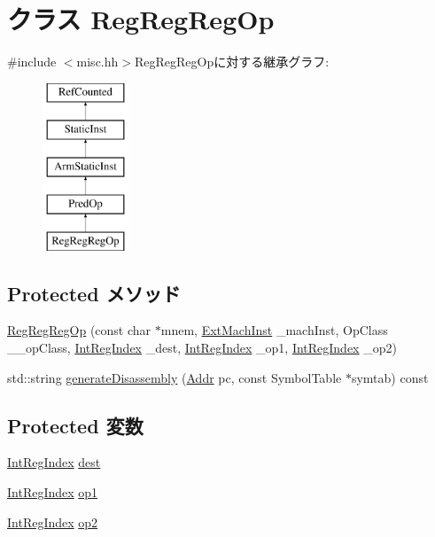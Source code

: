 \hypertarget{classRegRegRegOp}{
\section{クラス RegRegRegOp}
\label{classRegRegRegOp}
}


{\ttfamily \#include $<$misc.hh$>$}RegRegRegOpに対する継承グラフ:\begin{figure}[H]
\begin{center}
\leavevmode
\includegraphics[height=5cm]{classRegRegRegOp}
\end{center}
\end{figure}
\subsection*{Protected メソッド}
\begin{DoxyCompactItemize}
\item 
\hyperlink{classRegRegRegOp_a7d65b1f6ccc57959e842690810b55ad8}{RegRegRegOp} (const char $\ast$mnem, \hyperlink{classStaticInst_a5605d4fc727eae9e595325c90c0ec108}{ExtMachInst} \_\-machInst, OpClass \_\-\_\-opClass, \hyperlink{namespaceArmISA_ae64680ba9fb526106829d6bf92fc791b}{IntRegIndex} \_\-dest, \hyperlink{namespaceArmISA_ae64680ba9fb526106829d6bf92fc791b}{IntRegIndex} \_\-op1, \hyperlink{namespaceArmISA_ae64680ba9fb526106829d6bf92fc791b}{IntRegIndex} \_\-op2)
\item 
std::string \hyperlink{classRegRegRegOp_a95d323a22a5f07e14d6b4c9385a91896}{generateDisassembly} (\hyperlink{classm5_1_1params_1_1Addr}{Addr} pc, const SymbolTable $\ast$symtab) const 
\end{DoxyCompactItemize}
\subsection*{Protected 変数}
\begin{DoxyCompactItemize}
\item 
\hyperlink{namespaceArmISA_ae64680ba9fb526106829d6bf92fc791b}{IntRegIndex} \hyperlink{classRegRegRegOp_aec72e8e45bdc87abeeeb75d2a8a9a716}{dest}
\item 
\hyperlink{namespaceArmISA_ae64680ba9fb526106829d6bf92fc791b}{IntRegIndex} \hyperlink{classRegRegRegOp_a4c465c43ad568f8bcf8ae71480e9cfea}{op1}
\item 
\hyperlink{namespaceArmISA_ae64680ba9fb526106829d6bf92fc791b}{IntRegIndex} \hyperlink{classRegRegRegOp_a7799ff6cbe5a252199059eb8665820e7}{op2}
\end{DoxyCompactItemize}


